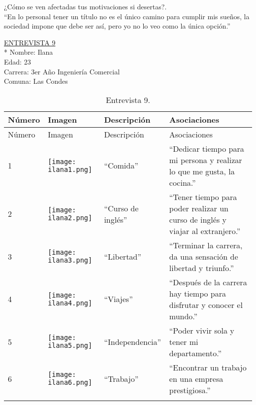 ¿Cómo se ven afectadas tus motivaciones si desertas?.\\

``En lo personal tener un título no es el único camino para cumplir mis sueños, la sociedad impone que debe ser así, pero yo no lo veo como la única opción.''


\underline {ENTREVISTA 9}\\*
Nombre: Ilana\\
Edad: 23\\
Carrera: 3er Año Ingeniería Comercial\\
Comuna: Las Condes \\

\begin{longtable}{>{\centering\arraybackslash}m{1cm} >{\centering\arraybackslash}m{2cm} >{\arraybackslash}m{5cm}>{\arraybackslash}m{5cm}}
	
	\hline
	Número & Imagen & Descripción & Asociaciones \\
	\hline \hline
	\endfirsthead
	
	\hline
	Número & Imagen & Descripción & Asociaciones \\
	\hline \hline
	\endhead

1 & \texttt{[image: ilana1.png]} & ``Comida'' & ``Dedicar tiempo para mi persona y realizar lo que me gusta, la cocina.'' \\
\hline

2 & \texttt{[image: ilana2.png]} & ``Curso de inglés'' & ``Tener tiempo para poder realizar un curso de inglés y viajar al extranjero.'' \\
\hline

3 & \texttt{[image: ilana3.png]} & ``Libertad'' & ``Terminar la carrera, da una sensación de libertad y triunfo.'' \\
\hline

4 & \texttt{[image: ilana4.png]} & ``Viajes'' & ``Después de la carrera hay tiempo para disfrutar y conocer el mundo.'' \\
\hline

5 & \texttt{[image: ilana5.png]} & ``Independencia'' & ``Poder vivir sola y tener mi departamento.'' \\
\hline

6 & \texttt{[image: ilana6.png]} & ``Trabajo'' & ``Encontrar un trabajo en una empresa prestigiosa.'' \\
\hline

\caption{Entrevista 9.}
\label{tabla:ilana}
\end{longtable}

